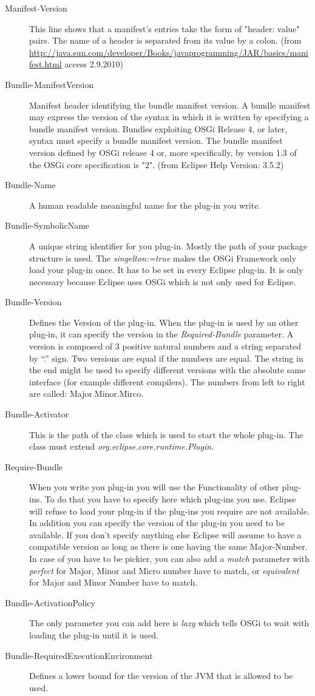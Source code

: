 \documentclass[a4paper,10pt]{report}
\begin{document}
\begin{description}
 \item[Manifest-Version] This line shows that a manifest's entries take the form of "header: value" pairs. The name of a header is separated from its value by a colon. (from \href{ http://java.sun.com/developer/Books/javaprogramming/JAR/basics/manifest.html}{ http://java.sun.com/developer/Books/javaprogramming/JAR/basics/manifest.html} access 2.9.2010)
 \item[Bundle-ManifestVersion] Manifest header identifying the bundle manifest version. A bundle manifest may express the version of the syntax in which it is written by specifying a bundle manifest version. Bundles exploiting OSGi Release 4, or later, syntax must specify a bundle manifest version. 
The bundle manifest version defined by OSGi release 4 or, more specifically, by version 1.3 of the OSGi core specification is "2". (from Eclipse Help Version: 3.5.2)
 \item[Bundle-Name] A human readable meaningful name for the plug-in you write.
 \item[Bundle-SymbolicName] A unique string identifier for you plug-in. Mostly the path of your package structure is used. The {\it singelton:=true} makes the OSGi Framework only load your plug-in once. It has to be set in every Eclipse plug-in. It is only necessary because Eclipse uses OSGi which is not only used for Eclipse.
 \item[Bundle-Version] Defines the Version of the plug-in. When the plug-in is used by an other plug-in, it can specify the version in the {\it Required-Bundle} parameter. A version is composed of 3 positive natural numbers and a string separated by ``.'' sign. Two versions are equal if the numbers are equal. The string in the end might be used to specify different versions with the absolute same interface (for example different compilers). The numbers from left to right are called: Major.Minor.Mirco.
 \item[Bundle-Activator] This is the path of the class which is used to start the whole plug-in. The class must extend {\it org.eclipse.core.runtime.Plugin}. 
 \item[Require-Bundle] When you write you plug-in you will use the Functionality of other plug-ins. To do that you have to specify here which plug-ins you use. Eclipse will refuse to load your plug-in if the plug-ins you require are not available. In addition you can specify the version of the plug-in you need to be available. If you don't specify anything else Eclipse will assume to have a compatible version as long as there is one having the same Major-Number. In case of you have to be pickier, you can also add a {\it match} parameter with {\it perfect} for Major, Minor and Micro number have to match, or {\it equivalent} for Major and Minor Number have to match.
 \item[Bundle-ActivationPolicy] The only parameter you can add here is {\it lazy} which tells OSGi to wait with loading the plug-in until it is used.
 \item[Bundle-RequiredExecutionEnvironment] Defines a lower bound for the version of the JVM that is allowed to be used.
 \end{description}
\end{document}
